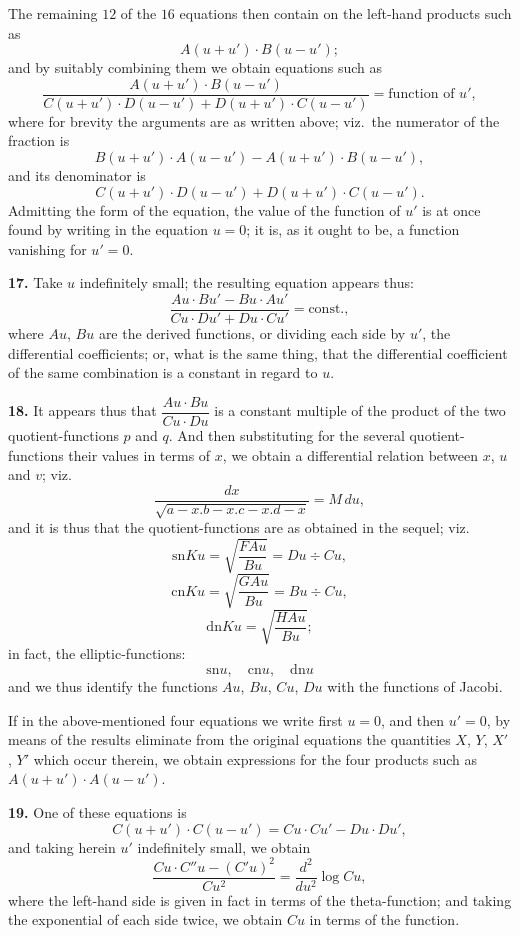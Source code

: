 \documentclass[11pt,a4paper]{book}
\providecommand{\sn}{\mathrm{sn}}
\providecommand{\cn}{\mathrm{cn}}
\providecommand{\dn}{\mathrm{dn}}
\begin{document}
The remaining $12$ of the $16$ equations then contain on the left-hand products such as
\[
A(u + u') \cdot B(u - u');
\]
and by suitably combining them we obtain equations such as
\[
\frac{A(u + u') \cdot B(u - u')}{C(u + u') \cdot D(u - u') + D(u + u') \cdot C(u - u')} = \text{function of } u',
\]
where for brevity the arguments are as written above; viz.\ the numerator of the fraction is
\[
B(u + u') \cdot A(u - u') - A(u + u') \cdot B(u - u'),
\]
and its denominator is
\[
C(u + u') \cdot D(u - u') + D(u + u') \cdot C(u - u').
\]
Admitting the form of the equation, the value of the function of $u'$ is at once found by writing in the equation $u = 0$; it is, as it ought to be, a function vanishing for $u' = 0$.

\noindent\textbf{17.}\quad
Take $u$ indefinitely small; the resulting equation appears thus:
\[
\frac{Au \cdot Bu' - Bu \cdot Au'}{Cu \cdot Du' + Du \cdot Cu'} = \text{const.},
\]
where $Au$, $Bu$ are the derived functions, or dividing each side by $u'$, the differential coefficients; or, what is the same thing, that the differential coefficient of the same combination is a constant in regard to $u$.

\noindent\textbf{18.}\quad
It appears thus that $\dfrac{Au \cdot Bu}{Cu \cdot Du}$ is a constant multiple of the product of the two quotient-functions $p$ and $q$. And then substituting for the several quotient-functions their values in terms of $x$, we obtain a differential relation between $x$, $u$ and $v$; viz.
\[
\frac{dx}{\sqrt{a - x . b - x . c - x . d - x}} = M\, du,
\]
and it is thus that the quotient-functions are as obtained in the sequel; viz.
\[
\sn Ku = \sqrt{\frac{FAu}{Bu}} = Du \div Cu,
\]
\[
\cn Ku = \sqrt{\frac{GAu}{Bu}} = Bu \div Cu,
\]
\[
\dn Ku = \sqrt{\frac{HAu}{Bu}};
\]
in fact, the elliptic-functions:
\[
\sn u,\quad \cn u,\quad \dn u
\]
and we thus identify the functions $Au$, $Bu$, $Cu$, $Du$ with the functions of Jacobi.

If in the above-mentioned four equations we write first $u = 0$, and then $u' = 0$, by means of the results eliminate from the original equations the quantities $X$, $Y$, $X'$, $Y'$ which occur therein, we obtain expressions for the four products such as $A(u + u') \cdot A(u - u')$.

\noindent\textbf{19.}\quad
One of these equations is
\[
C(u + u') \cdot C(u - u') = Cu \cdot Cu' - Du \cdot Du',
\]
and taking herein $u'$ indefinitely small, we obtain
\[
\frac{Cu \cdot C''u - (C'u)^2}{Cu^2} = \frac{d^2}{du^2}\log Cu,
\]
where the left-hand side is given in fact in terms of the theta-function; and taking the exponential of each side twice, we obtain $Cu$ in terms of the function.
\end{document}
